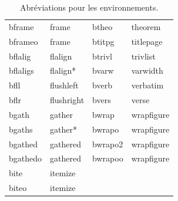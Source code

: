 \documentclass[11pt,french]{article}
\begin{document}
\begin{table}[H]
\begin{tabular}{llll}
bframe    & frame       & btheo   & theorem \\
bframeo   & frame       & btitpg  & titlepage \\
bflalig   & flalign     & btrivl  & trivlist \\
bflaligs  & flalign*    & bvarw   & varwidth \\
bfll      & flushleft   & bverb   & verbatim \\
bflr      & flushright  & bvers   & verse \\
bgath     & gather      & bwrap   & wrapfigure \\
bgaths    & gather*     & bwrapo  & wrapfigure \\
bgathed   & gathered    & bwrapo2 & wrapfigure \\
bgathedo  & gathered    & bwrapoo & wrapfigure \\
bite      & itemize     &         & \\
biteo     & itemize     &         & \\
\end{tabular}
\caption{Abréviations pour les environnements.}
\label{tblenvironments}
\end{table}
\end{document}
